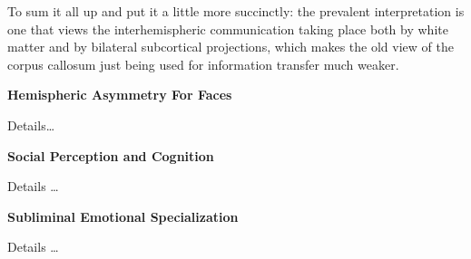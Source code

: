 \documentclass[basic]{inVerba-notes}
\begin{document}
To sum it all up and put it a little more succinctly: the prevalent interpretation is one that views the interhemispheric communication taking place both by white matter and by bilateral subcortical projections, which makes the old view of the corpus callosum just being used for information transfer much weaker.

\textbf{Hemispheric Asymmetry For Faces}

Details\dots

\textbf{Social Perception and Cognition}

Details \dots 

\textbf{Subliminal Emotional Specialization}

Details \dots 
\end{document}
